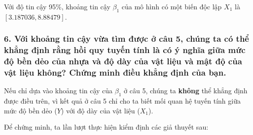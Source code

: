 \documentclass[a4paper]{article}
\theoremstyle{nonumberplain}
\begin{document}
Với độ tin cậy 95\%, khoảng tin cậy $\beta_1$ của mô hình có một biến độc lập $X_1$ là $[3.187036,8.88479]$.

\subsubsection*{6. Với khoảng tin cậy vừa tìm được ở câu 5, chúng ta có thể khẳng định rằng hồi quy tuyến tính là có ý nghĩa giữa mức độ bền dẻo của nhựa và độ dày của vật liệu và mật độ của vật liệu không? Chứng minh điều khẳng định của bạn.}

Nếu chỉ dựa vào khoảng tin cậy của $\beta_1$ ở câu 5, chúng ta \textbf{không} thể khẳng định được điều trên, vì kết quả ở câu 5 chỉ cho ta biết mối quan hệ tuyến tính giữa mức độ bền dẻo ($Y$) với độ dày của vật liệu ($X_1$).

Để chứng minh, ta lần lượt thực hiện kiểm định các giả thuyết sau:
\end{document}
